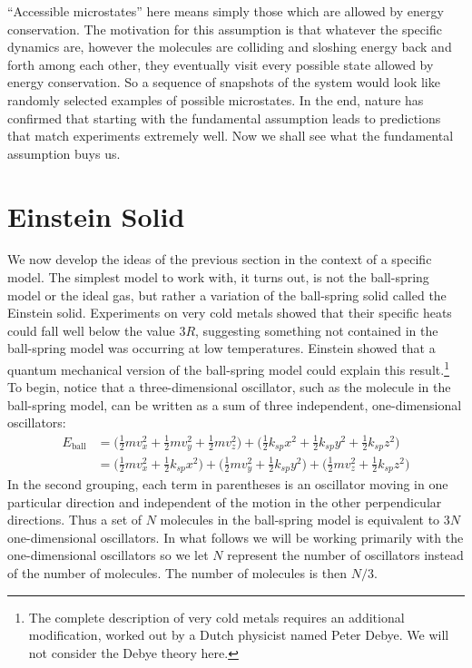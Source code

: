 
``Accessible microstates'' here means simply those which are allowed by
energy conservation.  The motivation for this assumption is that
whatever the specific dynamics are, however the molecules are
colliding and sloshing energy back and forth among each other, they
eventually visit every possible state allowed by energy conservation.
So a sequence of snapshots of the system would look like randomly
selected examples of possible microstates.   In the end, nature has
confirmed that starting with the fundamental assumption leads to
predictions that match experiments extremely well.  Now we shall see
what the fundamental assumption buys us.

\section{Einstein Solid}

We now develop the ideas of the previous section in the context of a
specific model.  The simplest model to work with, it turns out, is not
the ball-spring model or the ideal gas, but rather a variation of the
ball-spring solid called the Einstein solid.  Experiments on very cold
metals showed that their specific heats could fall well below the
value $3R$, suggesting something not contained in the ball-spring
model was occurring at low temperatures.  Einstein showed that a
quantum mechanical version of the ball-spring model could explain this
result.\footnote{The complete description of very cold metals requires
  an additional modification, worked out by a Dutch physicist named
  Peter Debye.  We will not consider the Debye theory here.}  To
begin, notice that a three-dimensional oscillator, such as the
molecule in the ball-spring model, can be written as a sum of three
independent, one-dimensional oscillators:
\begin{align}
E_\text{ball} &= \bigl(\textstyle\frac{1}{2} m v_x^2 + \frac{1}{2} m v_y^2 
+ \frac{1}{2} m v_z^2\bigr) +
\bigl(\textstyle\frac{1}{2} k_{sp} x^2
+ \frac{1}{2} k_{sp} y^2 + \frac{1}{2} k_{sp}z^2\bigr)
\nonumber\\[1.5ex]
 &= \bigl(\textstyle\frac{1}{2}mv_x^2+
   \frac{1}{2}k_{sp}x^2\bigr)
+\bigl(\textstyle\frac{1}{2}mv_y^2+\frac{1}{2}k_{sp}y^2\bigr)
+\bigl(\textstyle\frac{1}{2}mv_z^2+\frac{1}{2}k_{sp}z^2\bigr)
\end{align}
In the second grouping, each term in parentheses is an oscillator
moving in one particular direction and independent of the motion in
the other perpendicular directions.  Thus a set of $N$ molecules in
the ball-spring model is equivalent to $3N$ one-dimensional
oscillators.  In what follows we will be working primarily with the
one-dimensional oscillators so we let $N$ represent the number of
oscillators instead of the number of molecules.  The number of
molecules is then $N/3$.

